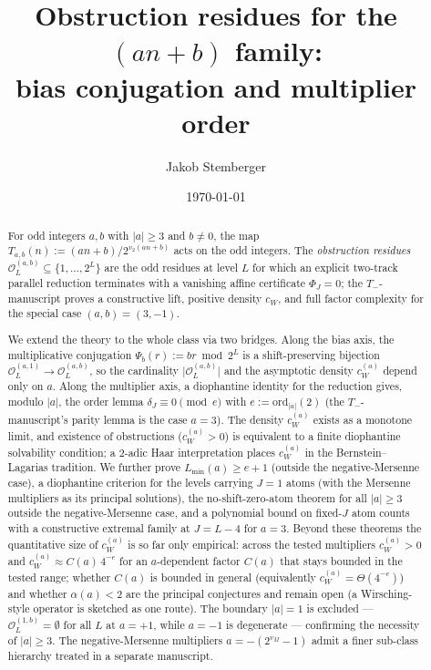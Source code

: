 \documentclass[11pt,reqno]{amsart}
\title[Obstruction residues for the $(an+b)$ family]{Obstruction residues for the \texorpdfstring{$(an+b)$}{(an+b)} family:\\
  bias conjugation and multiplier order}
\author{Jakob Stemberger}
\date{\today}
\theoremstyle{plain}
\theoremstyle{definition}
\theoremstyle{remark}
\newcommand{\Tab}{T_{a,b}}
\newcommand{\Tneg}{T_{-}}
\newcommand{\Obs}{\mathcal{O}}
\newcommand{\vtwo}{v_{2}}
\newcommand{\ord}{\mathrm{ord}}
\newcommand{\Psib}{\Psi_{b}}
\newcommand{\cWa}{c_{W}^{(a)}}
\newcommand{\Obsab}{\Obs_{L}^{(a,b)}}
\begin{document}
\begin{abstract}
For odd integers $a, b$ with $\lvert a \rvert \ge 3$ and $b \ne 0$, the map
$\Tab(n) := (an + b)/2^{\vtwo(an + b)}$ acts on the odd integers. The
\emph{obstruction residues} $\Obsab \subseteq \{1, \ldots, 2^L\}$ are the
odd residues at level $L$ for which an explicit two-track parallel reduction
terminates with a vanishing affine certificate $\Phi_J = 0$; the
$\Tneg$-manuscript proves a constructive lift, positive density $c_W$, and
full factor complexity for the special case $(a,b) = (3,-1)$.

We extend the theory to the whole class via two bridges. Along the bias
axis, the multiplicative conjugation $\Psib(r) := br \bmod 2^L$ is a
shift-preserving bijection $\Obs_L^{(a,1)} \to \Obsab$, so the cardinality
$\lvert \Obsab \rvert$ and the asymptotic density $\cWa$ depend only on
$a$. Along the multiplier axis, a diophantine identity for the reduction
gives, modulo $\lvert a \rvert$, the order lemma
$\delta_J \equiv 0 \pmod{e}$ with $e := \ord_{\lvert a \rvert}(2)$ (the
$\Tneg$-manuscript's parity lemma is the case $a = 3$). The density $\cWa$
exists as a monotone limit, and existence of obstructions ($\cWa > 0$) is
equivalent to a finite diophantine solvability condition; a $2$-adic Haar
interpretation places $\cWa$ in the Bernstein--Lagarias tradition. We
further prove
$L_{\min}(a) \ge e + 1$ (outside the negative-Mersenne case), a
diophantine criterion for the levels carrying
$J = 1$ atoms (with the Mersenne multipliers as its principal solutions),
the no-shift-zero-atom theorem for all $\lvert a \rvert \ge
3$ outside the negative-Mersenne case, and a polynomial bound on fixed-$J$
atom counts with a constructive extremal family at $J = L - 4$ for $a = 3$.
Beyond these theorems the quantitative size of $\cWa$ is so far only
empirical: across the tested multipliers $\cWa > 0$ and
$\cWa \approx C(a)\,4^{-e}$ for an $a$-dependent factor $C(a)$ that stays
bounded in the tested range; whether $C(a)$ is bounded in general
(equivalently $\cWa = \Theta(4^{-e})$) and whether $\alpha(a) < 2$ are the
principal conjectures and remain open (a Wirsching-style operator is
sketched as one route). The
boundary $\lvert a \rvert = 1$ is excluded --- $\Obs_L^{(1,b)} =
\emptyset$ for all $L$ at $a = +1$, while $a = -1$ is degenerate --- confirming
the necessity of $\lvert a \rvert \ge 3$. The negative-Mersenne multipliers
$a = -(2^{v_M} - 1)$ admit a finer sub-class hierarchy treated in a
separate manuscript.
\end{abstract}
\end{document}
